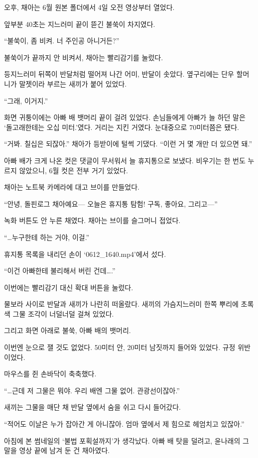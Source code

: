 \documentclass[
  korean,
  letterpaper,
  twoside,
  open=any,
  fontsize=12.5pt,
  headings=small]{scrbook}
\begin{document}
오후, 채아는 6월 원본 폴더에서
4일 오전 영상부터 열었다.

앞부분 40초는 지느러미 끝이
뜯긴 불쑥이 차지였다.

``불쑥이, 좀 비켜. 너 주인공
아니거든?''

불쑥이가 끝까지 안 비켜서,
채아는 빨리감기를 눌렀다.

등지느러미 뒤쪽이 반달처럼
떨어져 나간 어미, 반달이
솟았다. 옆구리에는 단우
할머니가 말젯이라 부르는
새끼가 붙어 있었다.

``그래, 이거지.''

화면 귀퉁이에는 아빠 배 뱃머리
끝이 걸려 있었다. 손님들에게
아빠가 늘 하던 말은
`돌고래한테는 오십 미터.'였다.
거리는 지킨 거였다. 눈대중으로
70미터쯤은 됐다.

``거봐. 칠십은 되잖아.''
채아가 등받이에 털썩 기댔다.
``이런 거 몇 개만 더 있으면
돼.''

아빠 배가 크게 나온 컷은
댓글이 무서워서 늘 휴지통으로
보냈다. 비우기는 한 번도
누르지 않았으니, 6월 컷은 전부
거기 있었다.

채아는 노트북 카메라에 대고
브이를 만들었다.

``안녕, 돌핀로그 채아예요---
오늘은 휴지통 탐험! 구독,
좋아요, 그리고---''

녹화 버튼도 안 누른 채였다.
채아는 브이를 슬그머니 접었다.

``\ldots 누구한테 하는 거야,
이걸.''

휴지통 목록을 내리던 손이
`0612\_1640.mp4'에서 섰다.

``이건 아빠한테 불리해서 버린
건데\ldots.''

이번에는 빨리감기 대신 확대
버튼을 눌렀다.

물보라 사이로 반달과 새끼가
나란히 떠올랐다. 새끼의
가슴지느러미 한쪽 뿌리에
초록색 그물 조각이 너덜너덜
걸쳐 있었다.

그리고 화면 아래로 불쑥, 아빠
배의 뱃머리.

이번엔 눈으로 잴 것도 없었다.
50미터 안, 20미터 남짓까지
들어와 있었다. 규정
위반이었다.

마우스를 쥔 손바닥이 축축했다.

``\ldots 근데 저 그물은 뭐야.
우리 배엔 그물 없어.
관광선이잖아.''

새끼는 그물을 매단 채 반달
옆에서 숨을 쉬고 다시
들어갔다.

``적어도 이날은 누가 잡아간 게
아니잖아. 엄마 옆에서 제
힘으로 헤엄치고 있잖아.''

아침에 본 썸네일의 `불법
포획설까지'가 생각났다. 아빠
배 탓을 덜려고, 윤나래의 그
말을 영상 끝에 남겨 둔 건
채아였다.
\end{document}
